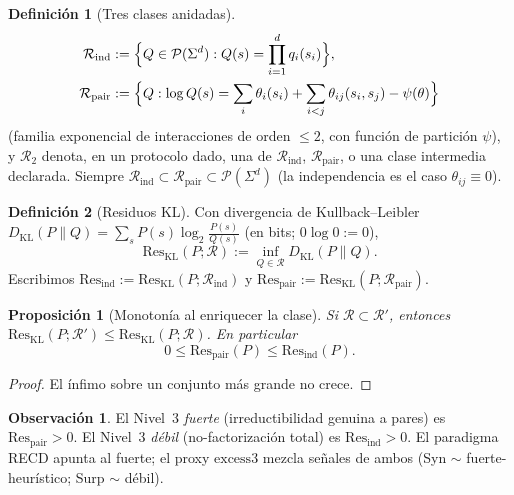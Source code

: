 \documentclass[11pt,a4paper]{article}
\theoremstyle{definition}
\newtheorem{definition}{Definici\'on}[section]
\newtheorem{remark}{Observaci\'on}[section]
\theoremstyle{plain}
\newtheorem{proposition}{Proposici\'on}[section]
\theoremstyle{remark}
\newcommand{\Res}{\mathrm{Res}}
\newcommand{\excess}{\mathrm{excess3}}
\newcommand{\Rtwo}{\mathcal{R}_{2}}
\newcommand{\Rind}{\mathcal{R}_{\mathrm{ind}}}
\newcommand{\Rpair}{\mathcal{R}_{\mathrm{pair}}}
\newcommand{\KL}{D_{\mathrm{KL}}}
\begin{document}
\begin{definition}[Tres clases anidadas]
\label{def:classes}
\begin{align}
\Rind
&:=\Bigl\{Q\in\mathcal{P}(\Sigma^d):
Q(s)=\prod_{i=1}^d q_i(s_i)\Bigr\},\\
\Rpair
&:=\Bigl\{Q:
\log Q(s)
=\sum_i\theta_i(s_i)+\sum_{i<j}\theta_{ij}(s_i,s_j)
-\psi(\theta)\Bigr\}
\end{align}
(familia exponencial de interacciones de orden $\le 2$, con funci\'on
de partici\'on $\psi$), y $\Rtwo$ denota, en un protocolo dado, una de
$\Rind$, $\Rpair$, o una clase inter\-media declarada.
Siempre $\Rind\subset\Rpair\subset\mathcal{P}(\Sigma^d)$ (la independencia
es el caso $\theta_{ij}\equiv 0$).
\end{definition}

\begin{definition}[Residuos KL]
\label{def:ResKL}
Con divergencia de Kullback--Leibler $\KL(P\|Q)=\sum_s P(s)\log_2\frac{P(s)}{Q(s)}$
(en bits; $0\log 0:=0$),
\begin{equation}
\label{eq:ResKL}
\Res_{\mathrm{KL}}(P;\mathcal{R})
:=\inf_{Q\in\mathcal{R}}\KL(P\|Q).
\end{equation}
Escribimos $\Res_{\mathrm{ind}}:=\Res_{\mathrm{KL}}(P;\Rind)$ y
$\Res_{\mathrm{pair}}:=\Res_{\mathrm{KL}}(P;\Rpair)$.
\end{definition}

\begin{proposition}[Monoton\'ia al enriquecer la clase]
\label{prop:mono}
Si $\mathcal{R}\subset\mathcal{R}'$, entonces
$\Res_{\mathrm{KL}}(P;\mathcal{R}')\le\Res_{\mathrm{KL}}(P;\mathcal{R})$.
En particular
\begin{equation}
0\le\Res_{\mathrm{pair}}(P)\le\Res_{\mathrm{ind}}(P).
\end{equation}
\end{proposition}

\begin{proof}
El \'infimo sobre un conjunto m\'as grande no crece.
\end{proof}

\begin{remark}
El Nivel~3 \emph{fuerte} (irreductibilidad genuina a pares) es
$\Res_{\mathrm{pair}}>0$. El Nivel~3 \emph{d\'ebil} (no-factorizaci\'on total)
es $\Res_{\mathrm{ind}}>0$. El paradigma RECD apunta al fuerte; el proxy
$\excess$ mezcla se\~nales de ambos (Syn $\sim$ fuerte-heur\'istico;
Surp $\sim$ d\'ebil).
\end{remark}
\end{document}
